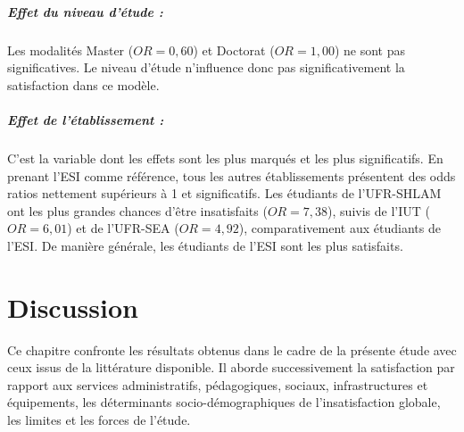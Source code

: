 \documentclass[
12pt,          %
a4paper,       %
oneside,      %
openright      %
]{report}          %
\begin{document}
		\paragraph{Effet du niveau d'étude :}
		Les modalités Master ($OR = 0{,}60$) et Doctorat ($OR = 1{,}00$) ne sont pas significatives. Le niveau d'étude n'influence donc pas significativement la satisfaction dans ce modèle.
		\paragraph{Effet de l'établissement :}
		C'est la variable dont les effets sont les plus marqués et les plus significatifs. En prenant l'ESI comme référence, tous les autres établissements présentent des odds ratios nettement supérieurs à 1 et significatifs.
		Les étudiants de l'UFR-SHLAM ont les plus grandes chances d'être insatisfaits ($OR = 7{,}38$), suivis de l'IUT ($OR = 6{,}01$) et de l'UFR-SEA ($OR = 4{,}92$), comparativement aux étudiants de l'ESI. De manière générale, les étudiants de l'ESI sont les plus satisfaits.
		
		
		
			\chapter{Discussion}
		\label{chap:discussion}
			Ce chapitre confronte les résultats obtenus dans le cadre de la présente étude avec ceux
		issus de la littérature disponible. Il aborde successivement la satisfaction par rapport aux services administratifs, pédagogiques, sociaux,
		infrastructures et équipements, les déterminants socio-démographiques de l'insatisfaction
		globale, les limites et les forces de l'étude.
		
\end{document}
